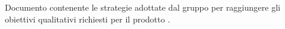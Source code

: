 Documento contenente le strategie adottate dal gruppo \gruppo per raggiungere gli obiettivi qualitativi richiesti per il prodotto \progetto.
